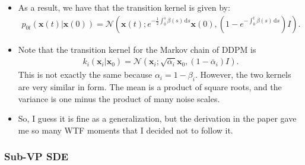 \documentclass[10pt]{article}
\newcommand{\dee}{\mathrm{d}}
\newcommand{\ve}[1]{\mathbf{#1}}
\newcommand{\mcal}[1]{\mathcal{#1}}
\begin{document}
\begin{itemize}
  \item As a result, we have that the transition kernel is given by:
  \begin{align*}
    p_{0t}(\ve{x}(t)|\ve{x}(0)) = \mcal{N}(\ve{x}(t); e^{-\frac{1}{2} \int_0^s \beta(s)\, \dee s} \ve{x}(0), (1 - e^{- \int_0^t \beta(s)\, \dee s}) I).
  \end{align*}  

  \item Note that the transition kernel for the Markov chain of DDPM is
  \begin{align*}
    k_i(\ve{x}_i|\ve{x}_0) = \mcal{N}(\ve{x}_i; \sqrt{\overline{\alpha}_i} \ve{x}_0, (1-\overline{\alpha}_i) I).
  \end{align*}
  This is not exactly the same because $\alpha_i = 1 - \beta_i$. However, the two kernels are very similar in form. The mean is a product of square roots, and the variance is one minus the product of many noise scales.

  \item So, I guess it is fine as a generalization, but the derivation in the paper gave me so many WTF moments that I decided not to follow it.
\end{itemize}

\subsubsection{Sub-VP SDE}
\end{document}
